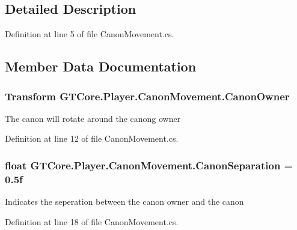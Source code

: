 \subsection{Detailed Description}


Definition at line 5 of file Canon\+Movement.\+cs.



\subsection{Member Data Documentation}
\hypertarget{class_g_t_core_1_1_player_1_1_canon_movement_af53ac38464eb96b0892af73ca9e9ed51}{}
\subsubsection[{Canon\+Owner}]{\setlength{\rightskip}{0pt plus 5cm}Transform G\+T\+Core.\+Player.\+Canon\+Movement.\+Canon\+Owner}\label{class_g_t_core_1_1_player_1_1_canon_movement_af53ac38464eb96b0892af73ca9e9ed51}


The canon will rotate around the canong owner 



Definition at line 12 of file Canon\+Movement.\+cs.

\hypertarget{class_g_t_core_1_1_player_1_1_canon_movement_a0fa4b6b53690e2d4b4d4e50bf108114c}{}
\subsubsection[{Canon\+Separation}]{\setlength{\rightskip}{0pt plus 5cm}float G\+T\+Core.\+Player.\+Canon\+Movement.\+Canon\+Separation = 0.\+5f}\label{class_g_t_core_1_1_player_1_1_canon_movement_a0fa4b6b53690e2d4b4d4e50bf108114c}


Indicates the seperation between the canon owner and the canon 



Definition at line 18 of file Canon\+Movement.\+cs.

\hypertarget{class_g_t_core_1_1_player_1_1_canon_movement_ad2b5f9544754bdc5104cbb98787dbedf}{}
